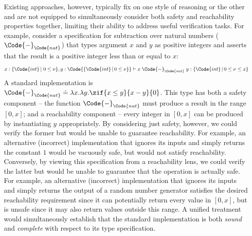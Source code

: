 Existing approaches, however, typically fix on one style of reasoning
or the other and are not equipped to simultaneously consider both
safety and reachability properties together, limiting their ability to
address useful verification tasks.  For example, consider a
specification for subtraction over natural numbers
($\Code{-}_{\Code{nat}}$) that types argument $x$ and $y$ as positive integers
and asserts that the result is a positive integer less than or equal to $x$:
      \[x : \{\Code{int}\, |\ 0 \leq \nu\}, y : \Code{\{\Code{int}\, |\, 0 \leq \nu \}}
      \vdash x\;\Code{-}_{\Code{nat}}\;y : \{\Code{int}\, |\, 0 \leq
      \nu \leq x \}\]
\noindent A standard implementation is $\Code{-}_{\Code{nat}} \doteq
\lambda x.\lambda y. \zif{x \leq y}{x - y}{0}$.  This type has both a
safety component -- the function $\Code{-}_{\Code{nat}}$ must produce
a result in the range $[0,x]$; and a reachability component -- every
integer in $[0,x]$ can be produced by instantiating $y$ appropriately.
By considering just safety, however, we could verify the former but
would be unable to guarantee reachability.  For example, an
alternative (incorrect) implementation that ignores its inputs and
simply returns the constant $1$ would be vacuously safe, but would not
satisfy reachability.  Conversely, by viewing this specification from
a reachability lens, we could verify the latter but would be unable to
guarantee that the operation is actually safe.  For example, an
alternative (incorrect) implementation that ignores its inputs and
simply returns the output of a random number generator satisfies the
desired reachability requirement since it can potentially return every
value in $[0, x]$, but is unsafe since it may also return values
outside this range.  A unified treatment would simultaneously
establish that the standard implementation is both \emph{sound} and
\emph{complete} with respect to its type specification.

\newcommand{\natminus}{\ensuremath{-_{\Code{nat}}}}

